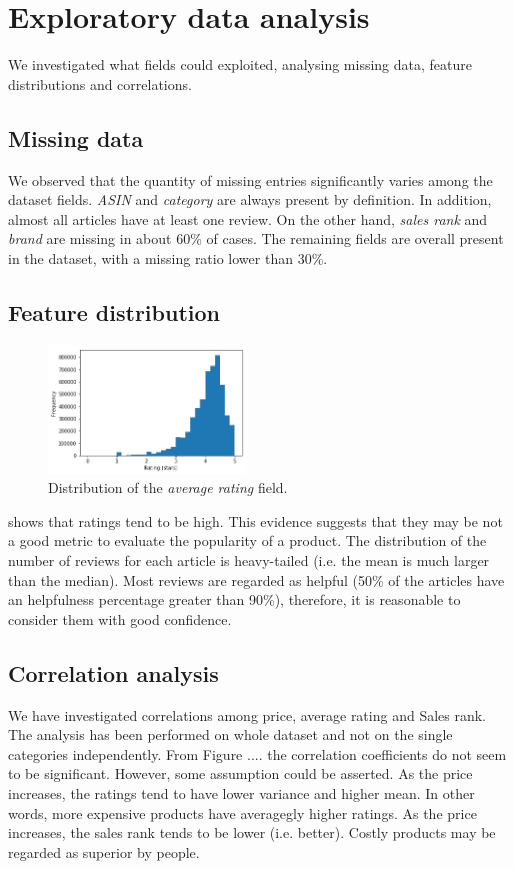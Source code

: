 \documentclass[11pt]{article}
\begin{document}
\section{Exploratory data analysis}
\label{sec:explodatanalysis}
We investigated what fields could exploited, analysing missing data, feature distributions and correlations.
\subsection{Missing data}
We observed that the quantity of missing entries significantly varies among the dataset fields. \textit{ASIN} and \textit{category} are always present by definition. In addition, almost all articles have at least one review. On the other hand, \textit{sales rank} and \textit{brand} are missing in about 60\% of cases. The remaining fields are overall present in the dataset, with a missing ratio lower than 30\%.
\subsection{Feature distribution}
\begin{figure}[h]
	\centering{}
	\includegraphics[width=0.47\textwidth]{img/avgReviews.png}
	\caption{Distribution of the \textit{average rating} field.}
	\label{fig:avgdist}
\end{figure}
 shows that ratings tend to be high. This evidence suggests that they may be not a good metric to evaluate the popularity of a product. The distribution of the number of reviews for each article is heavy-tailed (i.e. the mean is much larger than the median). Most reviews are regarded as helpful (50\% of the articles have an helpfulness percentage greater than 90\%), therefore, it is reasonable to consider them with good confidence.
\subsection{Correlation analysis}
We have investigated correlations among price, average rating and Sales rank. The analysis has been performed on whole dataset and not on the single categories independently. 
From Figure .... the correlation coefficients do not seem to be significant. However, some assumption could be asserted. As the price increases, the ratings tend to have lower variance and higher mean. In other words, more expensive products have averagegly higher ratings.
As the price increases, the sales rank tends to be lower (i.e. better). Costly products may be regarded as superior by people. 
\end{document}
